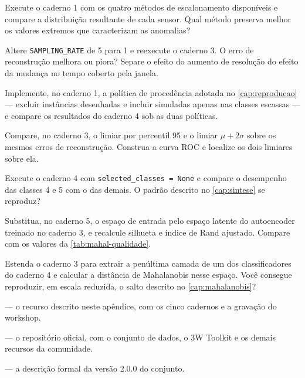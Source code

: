 \begin{exercicios}
\item Execute o caderno 1 com os quatro métodos de escalonamento disponíveis e compare a
      distribuição resultante de cada sensor. Qual método preserva melhor os valores
      extremos que caracterizam as anomalias?

\item Altere \texttt{SAMPLING\_RATE} de 5 para 1 e reexecute o caderno 3. O erro de
      reconstrução melhora ou piora? Separe o efeito do aumento de resolução do efeito da
      mudança no tempo coberto pela janela.

\item Implemente, no caderno 1, a política de procedência adotada no
      \cref{cap:reproducao} --- excluir instâncias desenhadas e incluir simuladas apenas
      nas classes escassas --- e compare os resultados do caderno 4 sob as duas políticas.

\item Compare, no caderno 3, o limiar por percentil 95 e o limiar $\mu + 2\sigma$ sobre os
      mesmos erros de reconstrução. Construa a curva ROC e localize os dois limiares
      sobre ela.

\item Execute o caderno 4 com \texttt{selected\_classes = None} e compare o desempenho das
      classes 4 e 5 com o das demais. O padrão descrito no \cref{cap:sintese} se
      reproduz?

\item Substitua, no caderno 5, o espaço de entrada pelo espaço latente do autoencoder
      treinado no caderno 3, e recalcule silhueta e índice de Rand ajustado. Compare com
      os valores da \cref{tab:mahal-qualidade}.

\item Estenda o caderno 3 para extrair a penúltima camada de um dos classificadores do
      caderno 4 e calcular a distância de Mahalanobis nesse espaço. Você consegue
      reproduzir, em escala reduzida, o salto descrito no \cref{cap:mahalanobis}?
\end{exercicios}

\begin{leituras}
\item \citet{Lopes2026Intro3W} --- o recurso descrito neste apêndice, com os cinco
      cadernos e a gravação do workshop.
\item \citet{Petrobras3W} --- o repositório oficial, com o conjunto de dados, o 3W Toolkit
      e os demais recursos da comunidade.
\item \citet{VazVargas2026_3w2} --- a descrição formal da versão 2.0.0 do conjunto.
\end{leituras}
